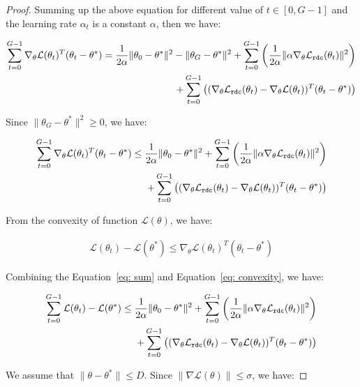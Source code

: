 \begin{proof}
    Summing up the above equation for different value of $t\in [0,G-1]$ and the learning rate $\alpha_t$ is a constant $\alpha$, then we have:

    \begin{align}
    \sum_{t=0}^{G-1} \nabla_{\theta} \mathcal{L}(\theta_t)^T(\theta_t - \theta^*) = \frac{1}{2\alpha} \|\theta_0 - \theta^*\|^2 - \|\theta_G - \theta^*\|^2 + \sum_{t=0}^{G-1}\left(\frac{1}{2\alpha}\|\alpha\nabla_{\theta} \mathcal L_{\mathtt{rdc}}(\theta_t)\|^2\right) \\
    + \sum_{t=0}^{G-1}\left((\nabla_{\theta} \mathcal L_{\mathtt{rdc}}(\theta_t) - \nabla_{\theta} \mathcal{L}(\theta_t) )^T(\theta_t - \theta^*)\right)
    \end{align}

    Since $\|\theta_G - \theta^*\|^2 \geq 0$, we have:

    \begin{align}
        \sum_{t=0}^{G-1} \nabla_{\theta} \mathcal{L}(\theta_t)^T(\theta_t - \theta^*) \leq \frac{1}{2\alpha} \|\theta_0 - \theta^*\|^2 + \sum_{t=0}^{G-1}\left(\frac{1}{2\alpha}\|\alpha\nabla_{\theta} \mathcal L_{\mathtt{rdc}}(\theta_t)\|^2\right) \\
        + \sum_{t=0}^{G-1}\left((\nabla_{\theta} \mathcal L_{\mathtt{rdc}}(\theta_t) - \nabla_{\theta} \mathcal{L}(\theta_t) )^T(\theta_t - \theta^*)\right)
        \label{eq: sum}
    \end{align}

From the convexity of function $\mathcal{L}(\theta)$, we have:

\begin{align}
    \mathcal{L}(\theta_t) - \mathcal{L}(\theta^*) \leq \nabla_{\theta} \mathcal{L}(\theta_t)^T(\theta_t - \theta^*)
    \label{eq: convexity}
\end{align}

Combining the Equation~\ref{eq: sum} and Equation~\ref{eq: convexity}, we have:

\begin{align}
    \sum_{t=0}^{G-1}\mathcal{L}(\theta_t) - \mathcal{L}(\theta^*) \leq \frac{1}{2\alpha} \|\theta_0 - \theta^*\|^2 + \sum_{t=0}^{G-1}\left(\frac{1}{2\alpha}\|\alpha\nabla_{\theta} \mathcal L_{\mathtt{rdc}}(\theta_t)\|^2\right) \\
    + \sum_{t=0}^{G-1}\left((\nabla_{\theta} \mathcal L_{\mathtt{rdc}}(\theta_t) - \nabla_{\theta} \mathcal{L}(\theta_t))^T(\theta_t - \theta^*)\right)
\end{align}

We assume that $\|\theta - \theta^*\|\leq D$.
Since $\| \nabla \mathcal L(\theta) \| \leq \sigma$, we have:


\end{proof}
